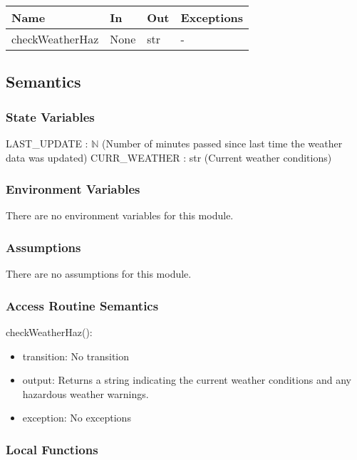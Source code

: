 \documentclass[12pt, titlepage]{article}
\begin{document}
\begin{center}
  \begin{tabular}{p{2cm} p{4cm} p{4cm} p{2cm}}
    \hline
    \textbf{Name} & \textbf{In} & \textbf{Out} & \textbf{Exceptions} \\
    \hline
    checkWeatherHaz & None & str & - \\
    \hline
\end{tabular}
\end{center}

\subsection{Semantics}

\subsubsection{State Variables}

LAST\_UPDATE : $\mathbb{N}$ (Number of minutes passed since last time the weather data was updated)
CURR\_WEATHER : str (Current weather conditions)

\subsubsection{Environment Variables}

There are no environment variables for this module.

\subsubsection{Assumptions}

There are no assumptions for this module.

\subsubsection{Access Routine Semantics}

\noindent checkWeatherHaz():
\begin{itemize}
\item transition: No transition
\item output: Returns a string indicating the current weather conditions and any hazardous weather warnings.
\item exception: No exceptions
\end{itemize}

\subsubsection{Local Functions}
\end{document}
